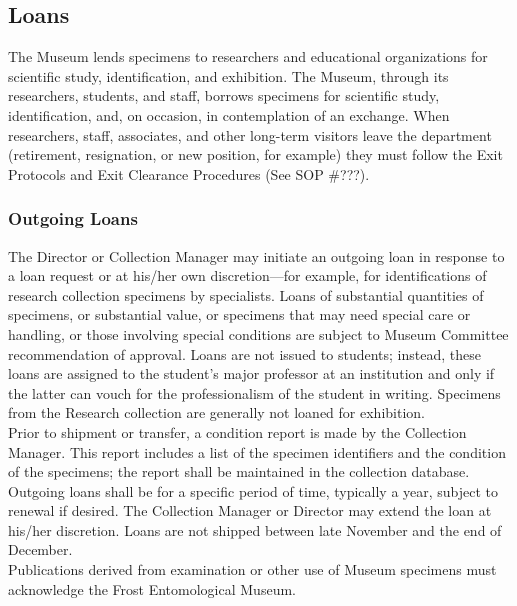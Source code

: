 \documentclass[letterpaper, 11pt]{article}
\begin{document}
\subsection{Loans}
The Museum lends specimens to researchers and educational organizations for scientific study, identification, and exhibition. The Museum, through its researchers, students, and staff, borrows specimens for scientific study, identification, and, on occasion, in contemplation of an exchange. When researchers, staff, associates, and other long-term visitors leave the department (retirement, resignation, or new position, for example) they must follow the Exit Protocols and Exit Clearance Procedures (See SOP \#???).%

\subsubsection{Outgoing Loans}
The Director or Collection Manager may initiate an outgoing loan in response to a loan request or at his/her own discretion---for example, for identifications of research collection specimens by specialists. Loans of substantial quantities of specimens, or substantial value, or specimens that may need special care or handling, or those involving special conditions are subject to Museum Committee recommendation of approval. Loans are not issued to students; instead, these loans are assigned to the student's major professor at an institution and only if the latter can vouch for the professionalism of the student in writing. Specimens from the Research collection are generally not loaned for exhibition.\\

\noindent{}Prior to shipment or transfer, a condition report is made by the Collection Manager. This report includes a list of the specimen identifiers and the condition of the specimens; the report shall be maintained in the collection database. Outgoing loans shall be for a specific period of time, typically a year, subject to renewal if desired. The Collection Manager or Director may extend the loan at his/her discretion. Loans are not shipped between late November and the end of December.\\

\noindent{}Publications derived from examination or other use of Museum specimens must acknowledge the Frost Entomological Museum.
\end{document}
